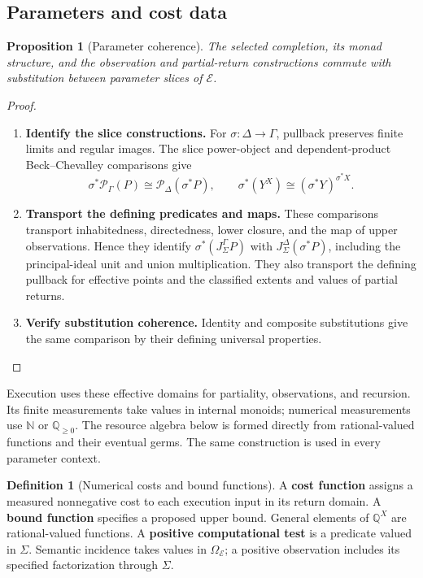\documentclass[11pt,a4paper]{article}
\numberwithin{algorithm}{section}
\numberwithin{equation}{section}
\newtheorem{proposition}[proposition]{Proposition}
\theoremstyle{definition}
\newtheorem{definition}[definition]{Definition}
\theoremstyle{remark}
\theoremstyle{plain}
\newcommand{\E}{\mathcal E}
\newcommand{\Truth}{\Omega_{\E}}
\newcommand{\N}{\mathbb N}
\newcommand{\QQ}{\mathbb Q}
\newcommand{\Pow}{\mathcal P}
\newcommand{\J}{J_{\Sigma}}
\newcommand{\Qplus}{{\QQ_{\ge0}}}
\theoremstyle{definition}
\theoremstyle{plain}
\begin{document}
\subsection{Parameters and cost data}
\begin{proposition}[Parameter coherence]\label{prop:standalone-parameters}
The selected completion, its monad structure, and the observation and
partial-return constructions commute with substitution between parameter
slices of $\E$.
\end{proposition}
\begin{proof}\leavevmode
\begin{enumerate}[leftmargin=*,align=left]
\item \textbf{Identify the slice constructions.}
For $\sigma:\Delta\to\Gamma$, pullback preserves finite limits and
regular images. The slice power-object and dependent-product
Beck--Chevalley comparisons give
\[
 \sigma^*\Pow_\Gamma(P)\cong\Pow_\Delta(\sigma^*P),\qquad
 \sigma^*(Y^X)\cong(\sigma^*Y)^{\sigma^*X}.
\]

\item \textbf{Transport the defining predicates and maps.}
These comparisons transport inhabitedness, directedness, lower closure,
and the map of upper observations. Hence they identify
$\sigma^*(\J^\Gamma P)$ with $\J^\Delta(\sigma^*P)$, including
the principal-ideal unit and union multiplication. They also transport
the defining pullback for effective points and the classified extents
and values of partial returns.

\item \textbf{Verify substitution coherence.}
Identity and composite substitutions
give the same comparison by their defining universal properties.
\end{enumerate}
\end{proof}

Execution uses these effective domains for partiality, observations,
and recursion. Its finite measurements take values in internal monoids;
numerical measurements use $\N$ or $\Qplus$. The resource algebra below
is formed directly from rational-valued functions and their eventual germs.
The same construction is used in every parameter context.

\begin{definition}[Numerical costs and bound functions]\label{def:cost-bound-functions}
A \textbf{cost function} assigns a measured nonnegative cost to each
execution input in its return domain. A \textbf{bound function}
specifies a proposed upper bound. General elements of $\QQ^X$ are
rational-valued functions. A \textbf{positive computational test} is a predicate valued in
$\Sigma$. Semantic incidence takes values in $\Truth$; a positive
observation includes its specified factorization through $\Sigma$.
\end{definition}
\end{document}
